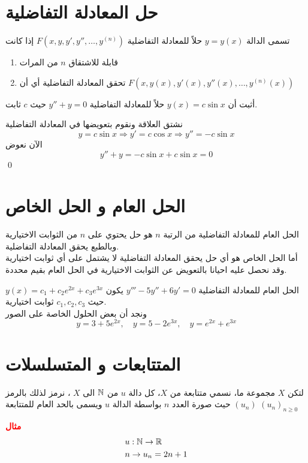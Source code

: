\section[حل المعادلة التفاضلية]{حل المعادلة التفاضلية \cite{diff_eqs_pt1}}
تسمى الدالة $y=y(x)$ حلاً للمعادلة التفاضلية $F(x,y,y',y'',\dots,y^{(n)})$ إذا كانت
\begin{enumerate}
    \item قابلة للاشتقاق $n$ من المرات
    \item تحقق المعادلة التفاضلية أي أن $F(x,y(x),y'(x),y''(x),\dots,y^{(n)}(x))$
\end{enumerate}
\begin{example}
    أثبت أن $y(x)=c \sin x$ حلاً للمعادلة التفاضلية $y''+y=0$ حيث $c$ ثابت.
\end{example}
\begin{solution}
    نشتق العلاقة ونقوم بتعويضها في المعادلة التفاضلية
\[
y=c\sin x\Rightarrow y'=c\cos x\Rightarrow y''=-c\sin x
\]
الآن نعوض
\[
y''+y=-c\sin x+c\sin x=0
\]\qed
\end{solution}
\section[الحل العام و الحل الخاص]{الحل العام و الحل الخاص \cite{diff_eqs_pt1}}
الحل العام للمعادلة التفاضلية من الرتبة $n$ هو حل يحتوي على $n$ من الثوابت الاختيارية وبالطبع يحقق المعادلة التفاضلية.\\
أما الحل الخاص هو أي حل يحقق المعادلة التفاضلية لا يشتمل على أي ثوابت اختيارية وقد نحصل عليه احيانا بالتعويض عن الثوابت الاختيارية في الحل العام بقيم محددة.

\begin{example}
    الحل العام للمعادلة التفاضلية $y'''-5y''+6y'=0$ يكون $y(x)=c_1+c_2e^{2x}+c_3e^{3x}$ حيث $c_1,c_2,c_3$ ثوابت اختيارية.\\
    ونجد أن بعض الحلول الخاصة على الصور 
    \[
    y=3+5e^{2x},\quad y=5-2e^{3x},\quad y=e^{2x}+e^{3x}
    \]
\end{example}

\section[المتتابعات و المتسلسلات]{المتتابعات و المتسلسلات \cite{mathanal}}

\begin{definition}
	لتكن $X$ مجموعة ما، نسمي متتابعة من $X$، كل دالة $u$ من $\mathbb{N}$ الى $X$ ، نرمز لذلك بالرمز $(u_n)$ حيث صورة العدد $n$ بواسطة الدالة $u$ ويسمى بالحد العام للمتتابعة $(u_n)_{n\geq 0}$
\end{definition}
\noindent
\textbf{\textcolor{red}{مثال}}
\begin{align*}
&u : \mathbb{N} \to \mathbb{R}\\
&n \to u_n = 2n+1
\end{align*}

